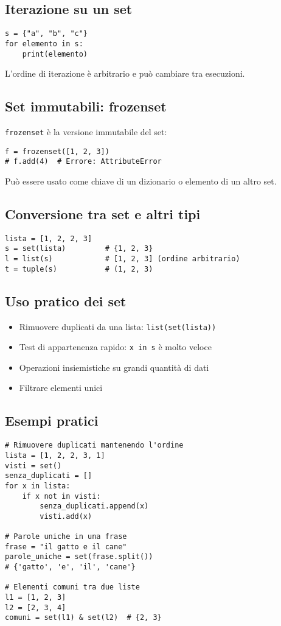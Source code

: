 \documentclass[a4paper,12pt]{article}
\begin{document}
\subsection*{Iterazione su un set}
\begin{lstlisting}
s = {"a", "b", "c"}
for elemento in s:
    print(elemento)
\end{lstlisting}
L'ordine di iterazione è arbitrario e può cambiare tra esecuzioni.

\subsection*{Set immutabili: frozenset}
\texttt{frozenset} è la versione immutabile del set:
\begin{lstlisting}
f = frozenset([1, 2, 3])
# f.add(4)  # Errore: AttributeError
\end{lstlisting}
Può essere usato come chiave di un dizionario o elemento di un altro set.

\subsection*{Conversione tra set e altri tipi}
\begin{lstlisting}
lista = [1, 2, 2, 3]
s = set(lista)         # {1, 2, 3}
l = list(s)            # [1, 2, 3] (ordine arbitrario)
t = tuple(s)           # (1, 2, 3)
\end{lstlisting}

\subsection*{Uso pratico dei set}
\begin{itemize}
    \item Rimuovere duplicati da una lista: \texttt{list(set(lista))}
    \item Test di appartenenza rapido: \texttt{x in s} è molto veloce
    \item Operazioni insiemistiche su grandi quantità di dati
    \item Filtrare elementi unici
\end{itemize}

\subsection*{Esempi pratici}
\begin{lstlisting}
# Rimuovere duplicati mantenendo l'ordine
lista = [1, 2, 2, 3, 1]
visti = set()
senza_duplicati = []
for x in lista:
    if x not in visti:
        senza_duplicati.append(x)
        visti.add(x)

# Parole uniche in una frase
frase = "il gatto e il cane"
parole_uniche = set(frase.split())
# {'gatto', 'e', 'il', 'cane'}

# Elementi comuni tra due liste
l1 = [1, 2, 3]
l2 = [2, 3, 4]
comuni = set(l1) & set(l2)  # {2, 3}
\end{lstlisting}
\end{document}
